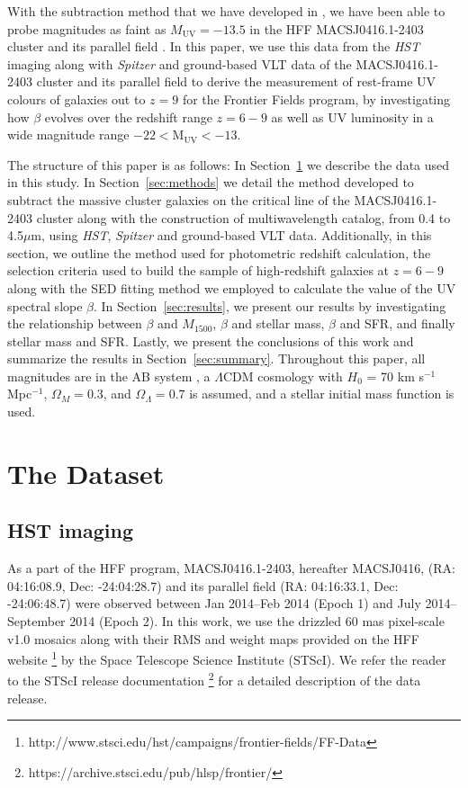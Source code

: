 \documentclass[twocolumn]{aastex63}
\begin{document}
With the subtraction method that we have developed in \citet{Bhatawdekar2019}, we have been able to probe magnitudes as faint as $M\mathrm{_{UV}=-13.5}$ in the HFF MACSJ0416.1-2403 cluster and its parallel field . In this paper, we use this data from the \textit{HST} imaging along with \textit{Spitzer} and ground-based VLT data of the MACSJ0416.1-2403 cluster and its parallel field to derive the measurement of rest-frame UV colours of galaxies out to $z=9$ for the Frontier Fields program, by investigating how $\beta$ evolves over the redshift range $z=6-9$ as well as UV luminosity in a wide magnitude range $-22<\mathrm{M_{UV}<-13}$.

The structure of this paper is as follows: In Section~\ref{sec:dataset} we describe the data used in this study. In Section~\ref{sec:methods} we detail the method developed to subtract the massive cluster galaxies on the critical line of the MACSJ0416.1-2403 cluster along with the construction of multiwavelength catalog, from 0.4 to 4.5$\mu$m, using \textit{HST}, \textit{Spitzer} and ground-based VLT data. Additionally, in this section, we outline the method used for photometric redshift calculation, the selection criteria used to build the sample of high-redshift galaxies at $z=6-9$ along with the SED fitting method we employed to calculate the value of the UV spectral slope $\beta$. In Section~\ref{sec:results}, we present our results by investigating the relationship between $\beta$ and $M_{1500}$, $\beta$ and stellar mass, $\beta$ and SFR, and finally stellar mass and SFR. Lastly, we present the conclusions of this work and summarize the results in Section~\ref{sec:summary}.
Throughout this paper, all magnitudes are in the AB system \citep{Oke1983}, a $\Lambda$CDM cosmology with $H_{0}$ = 70 km s$^{-1}$ Mpc$^{-1}$, $\Omega_{M} = 0.3$, and $\Omega_{\Lambda} = 0.7$ is assumed, and a \citet{chabrier2003} stellar initial mass function is used.


 \section{The Dataset} \label{sec:dataset}
\subsection{HST imaging}
As a part of the HFF program, MACSJ0416.1-2403, hereafter MACSJ0416, (RA: 04:16:08.9, Dec: -24:04:28.7) and its parallel field (RA: 04:16:33.1, Dec: -24:06:48.7) were observed between Jan 2014--Feb 2014 (Epoch 1) and July 2014--September 2014 (Epoch 2). In this work, we use the drizzled 60 mas pixel-scale v1.0 mosaics along with their RMS and weight maps provided on the HFF website \footnote[1]{http://www.stsci.edu/hst/campaigns/frontier-fields/FF-Data} by the Space Telescope Science Institute (STScI). We refer the reader to the STScI release documentation \footnote[2]{https://archive.stsci.edu/pub/hlsp/frontier/} for a detailed description of the data release.
\end{document}
